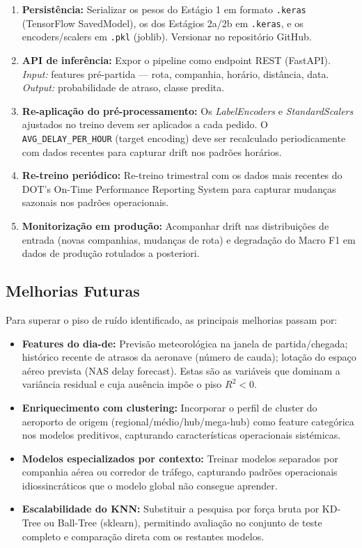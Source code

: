 \documentclass[conference]{IEEEtran}
\begin{document}
\begin{enumerate}
\item \textbf{Persistência:} Serializar os pesos do Estágio 1 em formato
      \texttt{.keras} (TensorFlow SavedModel), os dos Estágios 2a/2b em \texttt{.keras},
      e os encoders/scalers em \texttt{.pkl} (joblib). Versionar no repositório GitHub.
\item \textbf{API de inferência:} Expor o pipeline como endpoint REST (FastAPI).
      \textit{Input:} features pré-partida — rota, companhia, horário, distância, data.
      \textit{Output:} probabilidade de atraso, classe predita.
\item \textbf{Re-aplicação do pré-processamento:} Os \textit{LabelEncoders} e
      \textit{StandardScalers} ajustados no treino devem ser aplicados a cada pedido.
      O \texttt{AVG\_DELAY\_PER\_HOUR} (target encoding) deve ser recalculado
      periodicamente com dados recentes para capturar drift nos padrões horários.
\item \textbf{Re-treino periódico:} Re-treino trimestral com os dados mais recentes
      do DOT's On-Time Performance Reporting System para capturar mudanças sazonais
      nos padrões operacionais.
\item \textbf{Monitorização em produção:} Acompanhar drift nas distribuições de
      entrada (novas companhias, mudanças de rota) e degradação do Macro F1 em dados
      de produção rotulados a posteriori.
\end{enumerate}

\subsection{Melhorias Futuras}

Para superar o piso de ruído identificado, as principais melhorias passam por:

\begin{itemize}
\item \textbf{Features do dia-de:} Previsão meteorológica na janela de
      partida/chegada; histórico recente de atrasos da aeronave (número de cauda);
      lotação do espaço aéreo prevista (NAS delay forecast). Estas são as variáveis
      que dominam a variância residual e cuja ausência impõe o piso $R^2 < 0$.
\item \textbf{Enriquecimento com clustering:} Incorporar o perfil de cluster do
      aeroporto de origem (regional/médio/hub/mega-hub) como feature categórica nos
      modelos preditivos, capturando características operacionais sistémicas.
\item \textbf{Modelos especializados por contexto:} Treinar modelos separados por
      companhia aérea ou corredor de tráfego, capturando padrões operacionais
      idiossincráticos que o modelo global não consegue aprender.
\item \textbf{Escalabilidade do KNN:} Substituir a pesquisa por força bruta por
      KD-Tree ou Ball-Tree (sklearn), permitindo avaliação no conjunto de teste
      completo e comparação direta com os restantes modelos.
\end{itemize}
\end{document}
